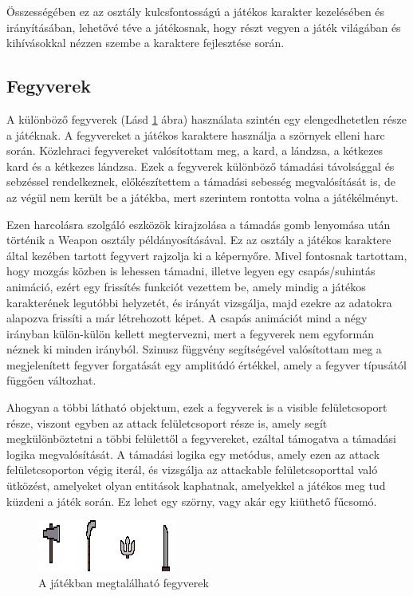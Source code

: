Összességében ez az osztály kulcsfontosságú a játékos karakter kezelésében és irányításában, lehetővé téve a játékosnak, hogy részt vegyen a játék világában és kihívásokkal nézzen szembe a karaktere fejlesztése során.

\subsection{Fegyverek} \label{subsec:Fegyverek}

 A különböző fegyverek (Lásd \ref{fig:A játékban megtalálható fegyverek} ábra) használata szintén egy elengedhetetlen része a játéknak. A fegyvereket a játékos karaktere használja a szörnyek elleni harc során. Közlehraci fegyvereket valósítottam meg, a kard, a lándzsa, a kétkezes kard és a kétkezes lándzsa. Ezek a fegyverek különböző támadási távolsággal és sebzéssel rendelkeznek, előkészítettem a támadási sebesség megvalósítását is, de az végül nem került be a játékba, mert szerintem rontotta volna a játékélményt.

Ezen harcolásra szolgáló eszközök kirajzolása a támadás gomb lenyomása után történik a Weapon osztály példányosításával. Ez az osztály a játékos karaktere által kezében tartott fegyvert rajzolja ki a képernyőre. Mivel fontosnak tartottam, hogy mozgás közben is lehessen támadni, illetve legyen egy csapás/suhintás animáció, ezért egy frissítés funkciót vezettem be, amely mindig a játékos karakterének legutóbbi helyzetét, és irányát vizsgálja, majd ezekre az adatokra alapozva frissíti a már létrehozott képet. A csapás animációt mind a négy irányban külön-külön kellett megtervezni, mert a fegyverek nem egyformán néznek ki minden irányból. Szinusz függvény segítségével valósítottam meg a megjelenített fegyver forgatását egy amplitúdó értékkel, amely a fegyver típusától függően változhat.

Ahogyan a többi látható objektum, ezek a fegyverek is a visible felületcsoport része, viszont egyben az attack felületcsoport része is, amely segít megkülönböztetni a többi felülettől a fegyvereket, ezáltal támogatva a támadási logika megvalósítását. A támadási logika egy metódus, amely ezen az attack felületcsoporton végig iterál, és vizsgálja az attackable felületcsoporttal való ütközést, amelyeket olyan entitások kaphatnak, amelyekkel a játékos meg tud küzdeni a játék során. Ez lehet egy szörny, vagy akár egy kiüthető fűcsomó. 

\begin{figure}[H]
    \centering
    \includegraphics[width=10truecm]{images/weapons.png}
    \caption{A játékban megtalálható fegyverek}
    \label{fig:A játékban megtalálható fegyverek}
\end{figure}


